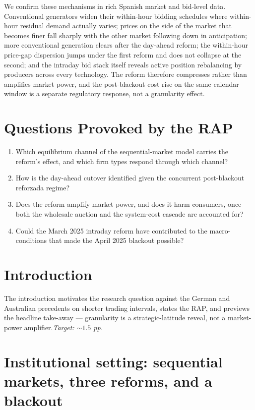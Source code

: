 \documentclass[11pt]{article}
\begin{document}
We confirm these mechanisms in rich Spanish market and bid-level data.
Conventional generators widen their within-hour bidding schedules
where within-hour residual demand actually varies; prices on the side
of the market that becomes finer fall sharply with the other market
following down in anticipation; more conventional generation clears
after the day-ahead reform; the within-hour price-gap dispersion
jumps under the first reform and does not collapse at the second;
and the intraday bid stack itself reveals active position rebalancing
by producers across every technology. The reform therefore compresses
rather than amplifies market power, and the post-blackout cost rise
on the same calendar window is a separate regulatory response, not a
granularity effect.


\section*{Questions Provoked by the RAP}

\begin{enumerate}
  \item Which equilibrium channel of the sequential-market model
        carries the reform's effect, and which firm types respond
        through which channel?
  \item How is the day-ahead cutover identified given the concurrent
        post-blackout reforzada regime?
  \item Does the reform amplify market power, and does it harm
        consumers, once both the wholesale auction and the system-cost
        cascade are accounted for?
  \item Could the March 2025 intraday reform have contributed to the
        macro-conditions that made the April 2025 blackout possible?
\end{enumerate}

\section{Introduction}

The introduction motivates the research question against the German and Australian precedents on shorter trading intervals, states the RAP, and previews the headline take-away --- granularity is a strategic-latitude reveal, not a market-power amplifier.\hfill\emph{Target: $\sim 1.5$ pp.}

\section{Institutional setting: sequential markets, three reforms, and a blackout}
\end{document}
